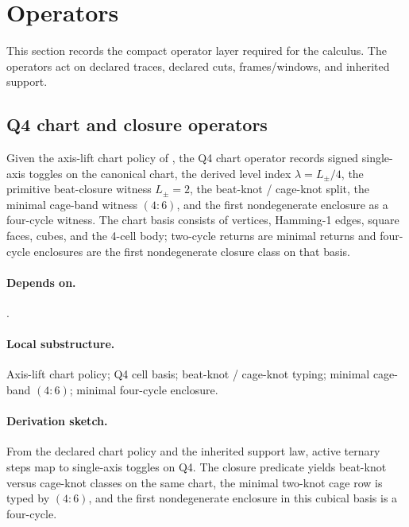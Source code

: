 \section{Operators}

This section records the compact operator layer required for the calculus. The operators act on declared traces, declared cuts, frames/windows, and inherited support.

\subsection{Q4 chart and closure operators}\label{subsec:q4-closure-operators}
\begin{definition}
\label{def:q4-closure-operator}
Given the axis-lift chart policy of , the Q4 chart operator records signed single-axis toggles on the canonical chart, the derived level index $\lambda=L_{\pm}/4$, the primitive beat-closure witness $L_{\pm}=2$, the beat-knot / cage-knot split, the minimal cage-band witness $(4{:}6)$, and the first nondegenerate enclosure as a four-cycle witness. The chart basis consists of vertices, Hamming-1 edges, square faces, cubes, and the 4-cell body; two-cycle returns are minimal returns and four-cycle enclosures are the first nondegenerate closure class on that basis.
\end{definition}

\paragraph{Depends on.} .
\paragraph{Local substructure.} Axis-lift chart policy; Q4 cell basis; beat-knot / cage-knot typing; minimal cage-band $(4{:}6)$; minimal four-cycle enclosure.
\paragraph{Derivation sketch.} From the declared chart policy and the inherited support law, active ternary steps map to single-axis toggles on Q4. The closure predicate yields beat-knot versus cage-knot classes on the same chart, the minimal two-knot cage row is typed by $(4{:}6)$, and the first nondegenerate enclosure in this cubical basis is a four-cycle.


